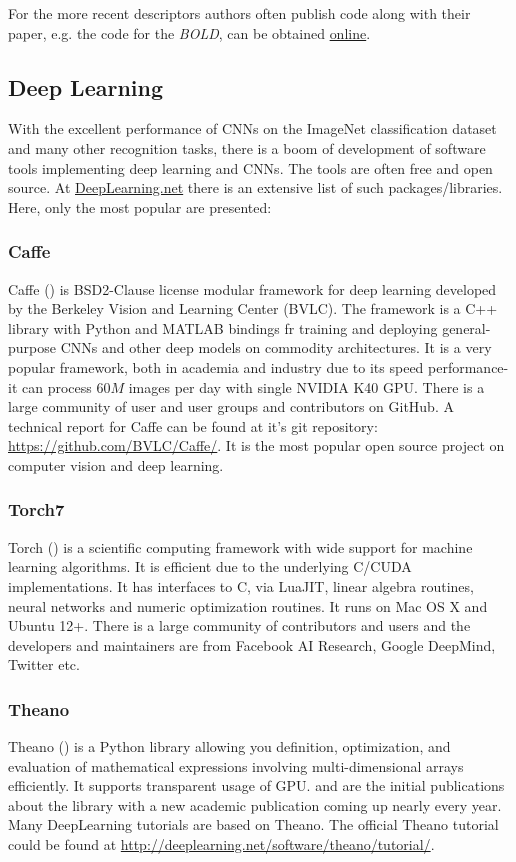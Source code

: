 {For the more recent descriptors authors often publish code along with their paper, e.g. the code for the {\em BOLD}, \cite{Balntas_2015_CVPR} can be obtained \href{http://vbalnt.io/projects/bold/}{online}.

\subsection{Deep Learning}
With the excellent performance of CNNs on the ImageNet classification dataset and many other recognition tasks, there is a boom of development of software tools implementing deep learning and CNNs. 
The tools are often free and open source. At \href{http://deeplearning.net/software_links/}{DeepLearning.net} there is an extensive list of such packages/libraries. Here, only the most popular are presented:
\subsubsection{Caffe}
Caffe (\cite{caffe_soft}) is BSD2-Clause license modular framework for deep learning developed by the Berkeley Vision and Learning Center (BVLC). The framework is a C++ library with Python and MATLAB bindings fr training and deploying general-purpose CNNs and other deep models on commodity architectures. It is a very popular framework, both in academia and industry due to its speed performance- it can process $60M$ images per day with single NVIDIA K40 GPU. There is a large community of user and user groups and contributors on GitHub. A technical report for Caffe can be found at it's git repository: \url{https://github.com/BVLC/Caffe/}. It is the most popular open source project on computer vision and deep learning.  
\subsubsection{Torch7}
Torch (\cite{torch_soft}) is a scientific computing framework with wide support for machine learning algorithms. It is efficient due to the underlying C/CUDA implementations. It has interfaces to C, via LuaJIT, linear algebra routines, neural networks and numeric optimization routines. It runs on Mac OS X and Ubuntu 12+. There is a large community of contributors and users and the developers and maintainers are from Facebook AI Research, Google DeepMind, Twitter etc. 
\subsubsection{Theano}
Theano (\cite{theano_soft}) is a Python library allowing you definition, optimization, and evaluation of mathematical expressions involving multi-dimensional arrays efficiently. It supports transparent usage of GPU. \cite{bergstra+al:2010-scipy} and \cite{Bastien-Theano-2012} are the initial publications about the library with a new academic publication coming up nearly every year. Many DeepLearning tutorials are based on Theano. The official Theano tutorial could be found at \url{http://deeplearning.net/software/theano/tutorial/}.
}

